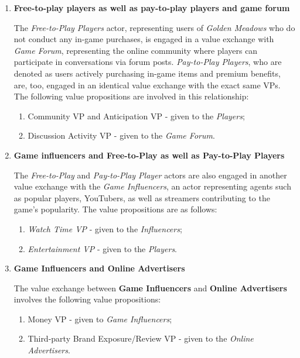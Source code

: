\documentclass{article}
\begin{document}
\begin{enumerate}
  \item \textbf{Free-to-play players as well as pay-to-play players and game forum}
  
    The \textit{Free-to-Play Players} actor, representing users of \textit{Golden Meadows} who do not conduct any in-game purchases, is engaged in a value exchange with \textit{Game Forum}, representing the online community where players can participate in conversations via forum posts. \textit{Pay-to-Play Players}, who are denoted as users actively purchasing in-game items and premium benefits, are, too, engaged in an identical value exchange with the exact same VPs. The following value propositions are involved in this relationship:
  
    \begin{enumerate}
    \item Community VP and Anticipation VP - given to the \textit{Players};
    \item Discussion Activity VP - given to the \textit{Game Forum}.
    \end{enumerate}

  \item \textbf{Game influencers and Free-to-Play as well as Pay-to-Play Players}

    The \textit{Free-to-Play} and \textit{Pay-to-Play Player} actors are also engaged in another value exchange with the \textit{Game Influencers}, an actor representing agents such as popular players, YouTubers, as well as streamers contributing to the game's popularity. The value propositions are as follows:

    \begin{enumerate}
    \item \textit{Watch Time VP} - given to the \textit{Influencers};
    \item \textit{Entertainment VP} - given to the \textit{Players}.
    \end{enumerate}

  \item \textbf{Game Influencers and Online Advertisers}

    The value exchange between \textbf{Game Influencers} and \textbf{Online Advertisers} involves the following value propositions:

    \begin{enumerate}
    \item Money VP - given to \textit{Game Influencers};
    \item Third-party Brand Exposure/Review VP - given to the \textit{Online Advertisers}.
    \end{enumerate}
\end{enumerate}
\end{document}
